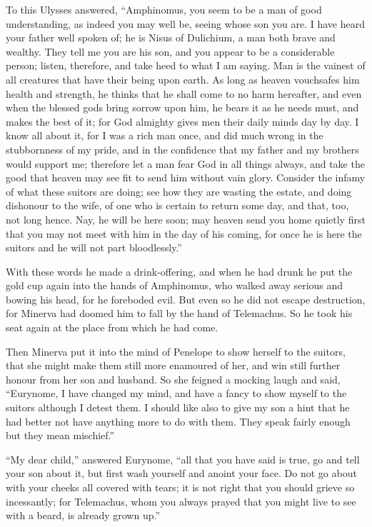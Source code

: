 To this Ulysses answered, “Amphinomus, you seem to be a man of good
understanding, as indeed you may well be, seeing whose son you are. I have
heard your father well spoken of; he is Nisus of Dulichium, a man both brave
and wealthy. They tell me you are his son, and you appear to be a considerable
person; listen, therefore, and take heed to what I am saying. Man is the
vainest of all creatures that have their being upon earth. As long as heaven
vouchsafes him health and strength, he thinks that he shall come to no harm
hereafter, and even when the blessed gods bring sorrow upon him, he bears it as
he needs must, and makes the best of it; for God almighty gives men their daily
minds day by day. I know all about it, for I was a rich man once, and did much
wrong in the stubbornness of my pride, and in the confidence that my father and
my brothers would support me; therefore let a man fear God in all things
always, and take the good that heaven may see fit to send him without vain
glory. Consider the infamy of what these suitors are doing; see how they are
wasting the estate, and doing dishonour to the wife, of one who is certain to
return some day, and that, too, not long hence. Nay, he will be here soon; may
heaven send you home quietly first that you may not meet with him in the day of
his coming, for once he is here the suitors and he will not part bloodlessly.”

With these words he made a drink-offering, and when he had drunk he put the
gold cup again into the hands of Amphinomus, who walked away serious and bowing
his head, for he foreboded evil. But even so he did not escape destruction, for
Minerva had doomed him to fall by the hand of Telemachus. So he took his seat
again at the place from which he had come.

Then Minerva put it into the mind of Penelope to show herself to the suitors,
that she might make them still more enamoured of her, and win still further
honour from her son and husband. So she feigned a mocking laugh and said,
“Eurynome, I have changed my mind, and have a fancy to show myself to the
suitors although I detest them. I should like also to give my son a hint that
he had better not have anything more to do with them. They speak fairly enough
but they mean mischief.”

“My dear child,” answered Eurynome, “all that you have said is true, go and
tell your son about it, but first wash yourself and anoint your face. Do not go
about with your cheeks all covered with tears; it is not right that you should
grieve so incessantly; for Telemachus, whom you always prayed that you might
live to see with a beard, is already grown up.”

